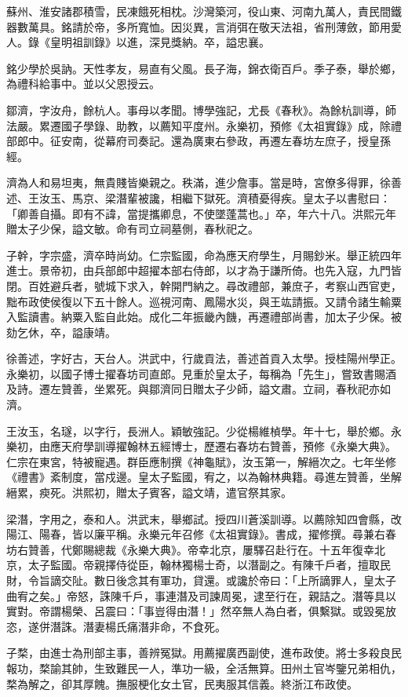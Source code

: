 \begin{pinyinscope}
蘇州、淮安諸郡積雪，民凍餓死相枕。沙灣築河，役山東、河南九萬人，責民間鐵器數萬具。銘請於帝，多所寬恤。因災異，言消弭在敬天法祖，省刑薄斂，節用愛人。錄《皇明祖訓錄》以進，深見獎納。卒，謚忠襄。

銘少學於吳訥。天性孝友，易直有父風。長子海，錦衣衛百戶。季子泰，舉於鄉，為禮科給事中。並以父恩授云。

鄒濟，字汝舟，餘杭人。事母以孝聞。博學強記，尤長《春秋》。為餘杭訓導，師法嚴。累遷國子學錄、助教，以薦知平度州。永樂初，預修《太祖實錄》成，除禮部郎中。征安南，從幕府司奏記。還為廣東右參政，再遷左春坊左庶子，授皇孫經。

濟為人和易坦夷，無貴賤皆樂親之。秩滿，進少詹事。當是時，宮僚多得罪，徐善述、王汝玉、馬京、梁潛輩被讒，相繼下獄死。濟積憂得疾。皇太子以書慰曰：「卿善自攝。即有不諱，當提攜卿息，不使墜蓬蒿也。」卒，年六十八。洪熙元年贈太子少保，謚文敏。命有司立祠墓側，春秋祀之。

子幹，字宗盛，濟卒時尚幼。仁宗監國，命為應天府學生，月賜鈔米。舉正統四年進士。景帝初，由兵部郎中超擢本部右侍郎，以才為于謙所倚。也先入寇，九門皆閉。百姓避兵者，號城下求入，幹開門納之。尋改禮部，兼庶子，考察山西官吏，黜布政使侯復以下五十餘人。巡視河南、鳳陽水災，與王竑請振。又請令諸生輸粟入監讀書。納粟入監自此始。成化二年振畿內饑，再遷禮部尚書，加太子少保。被劾乞休，卒，謚康靖。

徐善述，字好古，天台人。洪武中，行歲貢法，善述首貢入太學。授桂陽州學正。永樂初，以國子博士擢春坊司直郎。見重於皇太子，每稱為「先生」，嘗致書賜酒及詩。遷左贊善，坐累死。與鄒濟同日贈太子少師，謚文肅。立祠，春秋祀亦如濟。

王汝玉，名璲，以字行，長洲人。穎敏強記。少從楊維楨學。年十七，舉於鄉。永樂初，由應天府學訓導擢翰林五經博士，歷遷右春坊右贊善，預修《永樂大典》。仁宗在東宮，特被寵遇。群臣應制撰《神龜賦》，汝玉第一，解縉次之。七年坐修《禮書》紊制度，當戍邊。皇太子監國，宥之，以為翰林典籍。尋進左贊善，坐解縉累，瘐死。洪熙初，贈太子賓客，謚文靖，遣官祭其家。

梁潛，字用之，泰和人。洪武末，舉鄉試。授四川蒼溪訓導。以薦除知四會縣，改陽江、陽春，皆以廉平稱。永樂元年召修《太祖實錄》。書成，擢修撰。尋兼右春坊右贊善，代鄭賜總裁《永樂大典》。帝幸北京，屢驛召赴行在。十五年復幸北京，太子監國。帝親擇侍從臣，翰林獨楊士奇，以潛副之。有陳千戶者，擅取民財，令旨謫交阯。數日後念其有軍功，貸還。或讒於帝曰：「上所謫罪人，皇太子曲宥之矣。」帝怒，誅陳千戶，事連潛及司諫周冕，逮至行在，親詰之。潛等具以實對。帝謂楊榮、呂震曰：「事豈得由潛！」然卒無人為白者，俱繫獄。或毀冕放恣，遂併潛誅。潛妻楊氏痛潛非命，不食死。

子楘，由進士為刑部主事，善辨冤獄。用薦擢廣西副使，進布政使。將士多殺良民報功，楘諭其帥，生致難民一人，準功一級，全活無算。田州土官岑鑒兄弟相仇，楘為解之，卻其厚餽。撫服梗化女土官，民夷服其信義。終浙江布政使。


\end{pinyinscope}
